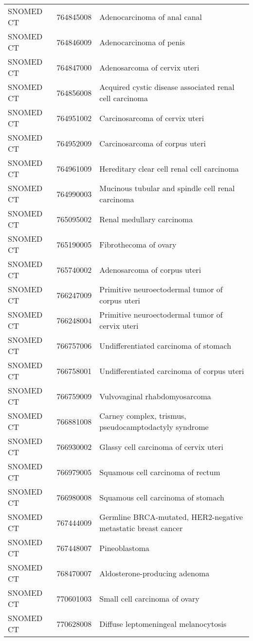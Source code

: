 \begin{longtable}{p{}p{}p{}}
  SNOMED CT & 764845008 & Adenocarcinoma of anal canal \\ 
  SNOMED CT & 764846009 & Adenocarcinoma of penis \\ 
  SNOMED CT & 764847000 & Adenosarcoma of cervix uteri \\ 
  SNOMED CT & 764856008 & Acquired cystic disease associated renal cell carcinoma \\ 
  SNOMED CT & 764951002 & Carcinosarcoma of cervix uteri \\ 
  SNOMED CT & 764952009 & Carcinosarcoma of corpus uteri \\ 
  SNOMED CT & 764961009 & Hereditary clear cell renal cell carcinoma \\ 
  SNOMED CT & 764990003 & Mucinous tubular and spindle cell renal carcinoma \\ 
  SNOMED CT & 765095002 & Renal medullary carcinoma \\ 
  SNOMED CT & 765190005 & Fibrothecoma of ovary \\ 
  SNOMED CT & 765740002 & Adenosarcoma of corpus uteri \\ 
  SNOMED CT & 766247009 & Primitive neuroectodermal tumor of corpus uteri \\ 
  SNOMED CT & 766248004 & Primitive neuroectodermal tumor of cervix uteri \\ 
  SNOMED CT & 766757006 & Undifferentiated carcinoma of stomach \\ 
  SNOMED CT & 766758001 & Undifferentiated carcinoma of corpus uteri \\ 
  SNOMED CT & 766759009 & Vulvovaginal rhabdomyosarcoma \\ 
  SNOMED CT & 766881008 & Carney complex, trismus, pseudocamptodactyly syndrome \\ 
  SNOMED CT & 766930002 & Glassy cell carcinoma of cervix uteri \\ 
  SNOMED CT & 766979005 & Squamous cell carcinoma of rectum \\ 
  SNOMED CT & 766980008 & Squamous cell carcinoma of stomach \\ 
  SNOMED CT & 767444009 & Germline BRCA-mutated, HER2-negative metastatic breast cancer \\ 
  SNOMED CT & 767448007 & Pineoblastoma \\ 
  SNOMED CT & 768470007 & Aldosterone-producing adenoma \\ 
  SNOMED CT & 770601003 & Small cell carcinoma of ovary \\ 
  SNOMED CT & 770628008 & Diffuse leptomeningeal melanocytosis \\ 

\end{longtable}
